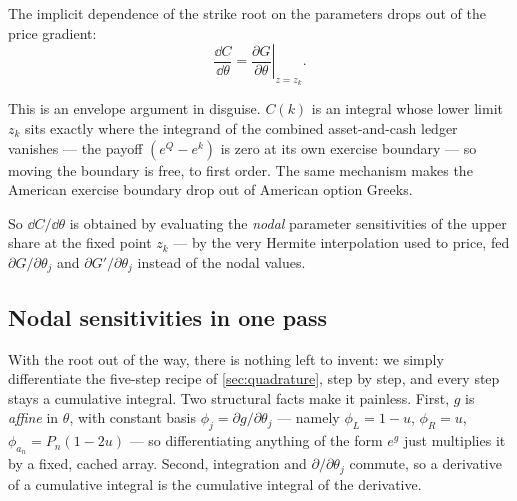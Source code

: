 \documentclass[11pt]{article}
\begin{document}
\begin{theorem}
\label{thm:cancel}
The implicit dependence of the strike root on the parameters drops out of the
price gradient:
\begin{equation}
\frac{\dd C}{\dd\theta}
=\left.\frac{\partial G}{\partial\theta}\right|_{z=z_k}.
\label{eq:dC}
\end{equation}
\end{theorem}

\begin{remark}
This is an envelope argument in disguise.  $C(k)$ is an integral whose lower
limit $z_k$ sits exactly where the integrand of the combined asset-and-cash
ledger vanishes --- the payoff $(e^{Q}-e^{k})$ is zero at its own exercise
boundary --- so moving the boundary is free, to first order.  The same
mechanism makes the American exercise boundary drop out of American option
Greeks.
\end{remark}

So $\dd C/\dd\theta$ is obtained by evaluating the \emph{nodal} parameter
sensitivities of the upper share at the fixed point $z_k$ --- by the very
Hermite interpolation used to price, fed
$\partial G/\partial\theta_j$ and $\partial G'/\partial\theta_j$ instead of
the nodal values.

\subsection{Nodal sensitivities in one pass}

With the root out of the way, there is nothing left to invent: we simply
differentiate the five-step recipe of \cref{sec:quadrature}, step by step,
and every step stays a cumulative integral.  Two structural facts make it
painless.  First, $g$ is \emph{affine} in $\theta$, with constant basis
$\phi_j=\partial g/\partial\theta_j$ --- namely $\phi_L=1-u$, $\phi_R=u$,
$\phi_{a_n}=P_n(1-2u)$ --- so differentiating anything of the form $e^{g}$
just multiplies it by a fixed, cached array.  Second, integration and
$\partial/\partial\theta_j$ commute, so a derivative of a cumulative
integral is the cumulative integral of the derivative.
\end{document}

